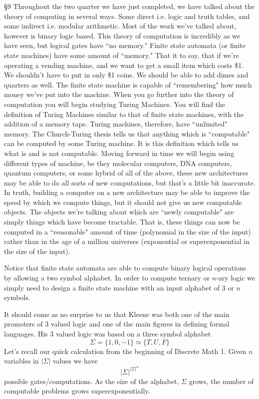 \documentclass[16 pt]{amsart}
\theoremstyle{definition}
\theoremstyle{remark}
\numberwithin{equation}{subsection}
\begin{document}
\S9
Throughout the two quarter we have just completed, we have talked about the theory of computing in several ways.  Some direct i.e. logic and truth tables, and some indirect i.e. modular arithmetic.  Most of the work we've talked about, however is binary logic based.  This theory of computation is incredibly as we have seen, but logical gates have ``no memory."  Finite state automata (or finite state machines) have some amount of ``memory."  That it to say, that if we're operating a vending machine, and we want to get a small item which costs \$1.  We shouldn't have to put in only \$1 coins.  We should be able to add dimes and quarters as well.  The finite state machine is capable of ``remembering" how much money we've put into the machine.  When you go further into the theory of computation you will begin studying Turing Machines.  You will find the definition of Turing Machines similar to that of finite state machines, with the addition of a memory tape.  Turing machines, therefore, have ``unlimited" memory.  The Church-Turing thesis tells us that anything which is ``computable" can be computed by some Turing machine.  It is this definition which tells us what is and is not computable.  Moving forward in time we will begin using different types of machine, be they molecular computers, DNA computers, quantum computers, or some hybrid of all of the above, these new architectures may be able to do all sorts of new computations, but that's a little bit inaccurate.  In truth, building a computer on a new architecture may be able to improve  the speed by which we compute things, but it should not give us new computable objects.  The objects we're talking about which are ``newly computable" are simply things which have become tractable.  That is, these things can now be computed in a ``reasonable" amount of time (polynomial in the size of the input) rather than in the age of a million universes (exponential or superexponential in the size of the input).

Notice that finite state automata are able to compute binary logical operations by allowing a two symbol alphabet.  In order to compute ternary or $n$-ary logic we simply need to design a finite state machine with an input alphabet of 3 or $n$ symbols.  

It should come as no surprise to us that Kleene was both one of the main promoters of 3 valued logic and one of the main figures in defining formal languages.  His 3 valued logic was based on a three symbol alphabet
\[
\Sigma = \{1,0,-1 \} \simeq \{T,U,F\}
\]
Let's recall our quick calculation from the beginning of Discrete Math 1.  Given $n$ variables in $|\Sigma|$ values we have
\[
|\Sigma|^{|\Sigma|^n} 
\]
possible gates/computations.  As the size of the alphabet, $\Sigma$ grows, the number of computable problems grows superexponentially.
\end{document}
